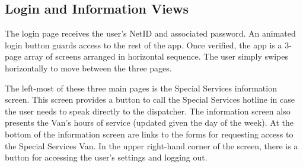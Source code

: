 \documentclass[12pt, a4paper]{article}
\begin{document}
\begin{multicols*}{2}
\subsection{Login and Information Views}
The login page receives the user's NetID and associated password. An animated login button guards access to the rest of the app. Once verified, the app is a 3-page array of screens arranged in horizontal sequence. The user simply swipes horizontally to move between the three pages.

The left-most of these three main pages is the Special Services information screen. This screen provides a button to call the Special Services hotline in case the user needs to speak directly to the dispatcher. The information screen also presents the Van's hours of service (updated given the day of the week). At the bottom of the information screen are links to the forms for requesting access to the Special Services Van. In the upper right-hand corner of the screen, there is a button for accessing the user's settings and logging out.


\end{multicols*}
\end{document}
